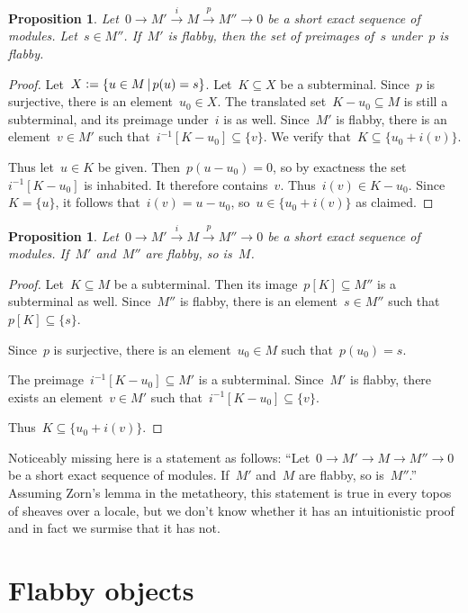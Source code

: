 \documentclass[oneside]{amsart}
\theoremstyle{definition}
\theoremstyle{plain}
\newtheorem{prop}[defn]{Proposition}
\theoremstyle{remark}
\newcommand{\xra}[1]{\xrightarrow{#1}}
\newcommand{\defeq}{\vcentcolon=}
\renewcommand{\_}{\mathpunct{.}\,}
\begin{document}
\begin{prop}\label{prop:set-of-preimages-flabby}
Let~$0 \to M' \xra{i} M \xra{p} M'' \to 0$ be a short exact
sequence of modules. Let~$s \in M''$. If~$M'$ is flabby, then the set of
preimages of~$s$ under~$p$ is flabby.
\end{prop}

\begin{proof}Let~$X \defeq \{ u \in M \,|\, p(u) = s
\}$. Let~$K \subseteq X$ be a subterminal. Since~$p$ is surjective, there is an
element~$u_0 \in X$. The translated set~$K - u_0 \subseteq M$ is still a
subterminal, and its preimage under~$i$ is as well. Since~$M'$ is flabby, there
is an element~$v \in M'$ such that~$i^{-1}[K - u_0] \subseteq \{v\}$. We verify
that~$K \subseteq \{u_0 + i(v)\}$.

Thus let~$u \in K$ be given. Then~$p(u - u_0) = 0$, so by exactness the
set~$i^{-1}[K - u_0]$ is inhabited. It therefore contains~$v$. Thus~$i(v) \in K
- u_0$. Since~$K = \{u\}$, it follows that~$i(v) = u - u_0$, so~$u \in \{u_0 +
i(v)\}$ as claimed.
\end{proof}

\begin{prop}Let~$0 \to M' \xra{i} M \xra{p} M'' \to 0$ be a short exact
sequence of modules. If~$M'$ and~$M''$ are flabby, so is~$M$.
\end{prop}

\begin{proof}Let~$K \subseteq M$ be a subterminal. Then its image~$p[K] \subseteq M''$
is a subterminal as well. Since~$M''$ is flabby, there is an element~$s \in
M''$ such that~$p[K] \subseteq \{ s \}$.

Since~$p$ is surjective, there is an element~$u_0 \in M$ such that~$p(u_0) =
s$.

The preimage~$i^{-1}[K - u_0] \subseteq M'$ is a subterminal. Since~$M'$ is
flabby, there exists an element~$v \in M'$ such that~$i^{-1}[K - u_0] \subseteq
\{v\}$.

Thus~$K \subseteq \{ u_0 + i(v) \}$.
\end{proof}

Noticeably missing here is a statement as follows: ``Let~$0 \to M' \to M \to
M'' \to 0$ be a short exact sequence of modules. If~$M'$ and~$M$ are flabby, so
is~$M''$.'' Assuming Zorn's lemma in the metatheory, this statement is true in
every topos of sheaves over a locale, but we don't know whether it has an
intuitionistic proof and in fact we surmise that it has not.


\section{Flabby objects}
\end{document}
